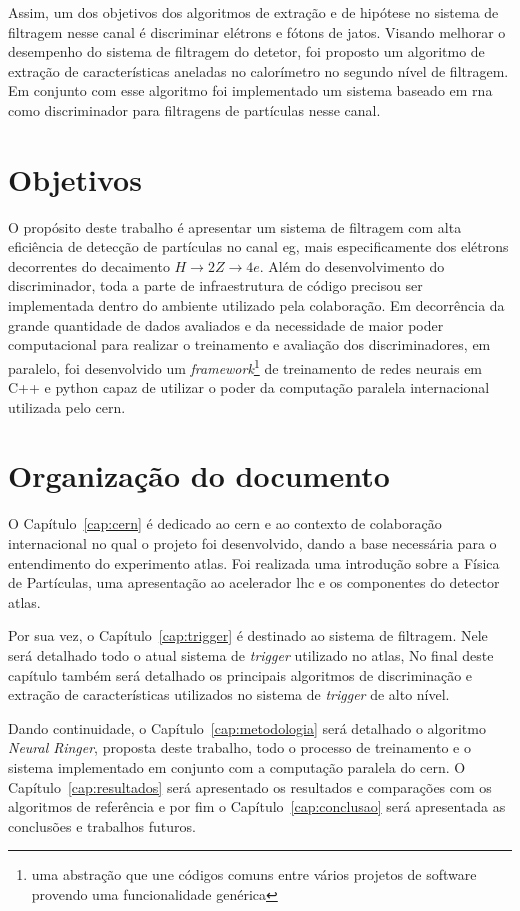 Assim, um dos objetivos dos algoritmos de extração e de hipótese no sistema de filtragem nesse canal é
discriminar elétrons e fótons de jatos. Visando melhorar o desempenho do sistema de filtragem do detetor, 
foi proposto um algoritmo de extração de características aneladas no calorímetro no segundo nível de filtragem. 
Em conjunto com esse algoritmo foi implementado um sistema baseado em \gls{rna} como discriminador 
para filtragens de partículas nesse canal.



\section{Objetivos} 
O propósito deste trabalho é apresentar um sistema de filtragem com alta eficiência de detecção de partículas
no canal \acrshort{eg}, mais especificamente dos elétrons decorrentes do decaimento $H\rightarrow 2Z\rightarrow 4e$. Além do desenvolvimento 
do discriminador, toda a parte de infraestrutura de código precisou ser implementada dentro do ambiente utilizado pela colaboração. 
Em decorrência da grande quantidade de dados avaliados e da necessidade de maior poder computacional para realizar
o treinamento e avaliação dos discriminadores, em paralelo, foi desenvolvido um \textit{framework}\footnote{uma abstração que une códigos 
comuns entre vários projetos de software provendo uma funcionalidade genérica} de treinamento 
de redes neurais em C++ e python capaz de utilizar o poder da computação paralela internacional utilizada pelo \gls{cern}.

\newpage

\section{Organização do documento}{{{



O Capítulo~\ref{cap:cern} é dedicado ao \gls{cern} e ao contexto de colaboração internacional
no qual o projeto foi desenvolvido, dando a base necessária para o entendimento
do experimento \gls{atlas}. Foi realizada uma introdução sobre a Física de
Partículas, uma apresentação ao acelerador \gls{lhc} e os componentes do detector \gls{atlas}.

Por sua vez, o Capítulo~\ref{cap:trigger} é destinado ao sistema de filtragem. Nele será detalhado todo o atual
sistema de \textit{trigger} utilizado no \gls{atlas}, No final deste capítulo também será detalhado os principais
algoritmos de discriminação e extração de características utilizados no sistema de \textit{trigger} de alto nível.

Dando continuidade, o Capítulo~\ref{cap:metodologia} será detalhado o algoritmo \textit{Neural Ringer}, proposta 
deste trabalho, todo o processo de treinamento e  o sistema implementado em conjunto com a computação paralela do \gls{cern}.
O Capítulo~\ref{cap:resultados} será apresentado os resultados e comparações com os algoritmos de referência e por fim 
o Capítulo~\ref{cap:conclusao}  será apresentada as conclusões e trabalhos futuros.

}}}







